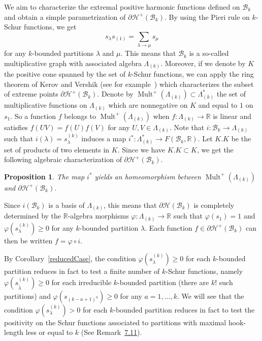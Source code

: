 \documentclass[10pt,a4paper]{amsart}
\newtheorem{prop}[theorem]{Proposition}
\theoremstyle{definition}
\DeclareMathOperator{\Mult}{Mult}
\begin{document}
We aim to characterize the extremal positive harmonic functions
defined on $\mathcal{B}_{k}$ and obtain a simple parametrization of
$\partial\mathcal{H}^{+}(\mathcal{B}_{k})$. By using the Pieri rule on
$k$-Schur functions, we get%
\[
s_{\lambda}s_{(1)}=\sum_{\lambda\rightarrow\mu}s_{\mu}%
\]
for any $k$-bounded partitions $\lambda$ and $\mu$. This means that
$\mathcal{B}_{k}$ is a so-called multiplicative graph with associated algebra
$\Lambda_{(k)}$. Moreover, if we denote by $K$ the positive cone spanned by
the set of $k$-Schur functions, we can apply the ring theorem of Kerov and
Vershik (see for example~\cite[Section~8.4]{LT}) which characterizes the
subset of extreme points $\partial\mathcal{H}^{+}(\mathcal{B}_{k})$. Denote
by $\Mult ^{+}(\Lambda_{(k)})\subset\Lambda_{(k)}^{\ast}$ the set of
multiplicative functions on $\Lambda_{(k)}$ which are nonnegative on $K$ and
equal to $1$ on $s_{1}$. So a function $f$ belongs to $\Mult %
^{+}(\Lambda_{(k)})$ when $f:\Lambda_{(k)}\rightarrow\mathbb{R}$ is linear and
satisfies $f(UV)=f(U)f(V)$ for any $U,V\in\Lambda_{(k)}$. Note that
$i:\mathcal{B}_{k}\longrightarrow\Lambda_{(k)}$ such that $i(\lambda
)=s_{\lambda}^{(k)}$ induces a map $i^{\ast}:\Lambda_{(k)}^{\ast
}\longrightarrow F(\mathcal{B}_{k},\mathbb{R})$. Let $K.K$ be the set of products of two elements in $K$. Since we have $K.K\subset K$,
we get the following algebraic characterization of $\partial\mathcal{H}%
^{+}(\mathcal{B}_{k})$.

\begin{prop}
\label{multiGraphExtreme}The map $i^{\ast}$ yields an homeomorphism between
$\Mult ^{+}(\Lambda_{(k)})$ and $\partial\mathcal{H}^{+}(\mathcal{B}%
_{k})$. 
\end{prop}

Since $i(\mathcal{B}_{k})$ is a basis of $\Lambda_{(k)}$, this means that
$\partial\mathcal{H}(\mathcal{B}_{k})$ is completely determined by the
$\mathbb{R}$-algebra morphisms $\varphi:\Lambda_{(k)}\rightarrow\mathbb{R}$
such that $\varphi(s_{1})=1$ and $\varphi(s_{\lambda}^{(k)})\geq0$ for any
$k$-bounded partition $\lambda$. Each function $f\in\partial\mathcal{H}%
^{+}(\mathcal{B}_{k})$ can then be written $f=\varphi\circ i$.

By Corollary~\ref{reducedCase}, the condition $\varphi(s_{\lambda}^{(k)}%
)\geq0$ for each $k$-bounded partition reduces in fact to test a finite number
of $k$-Schur functions, namely $\varphi(s_{\widetilde{\lambda}}^{(k)})\geq0$
for each irreducible $k$-bounded partition (there are $k!$ such
partitions) and $\varphi(s_{(k-a+1)^{a}})\geq0$ for any $a=1,\ldots,k$. We
will see that the condition $\varphi(s_{\lambda}^{(k)})>0$ for each
$k$-bounded partition reduces in fact to test the positivity on the Schur
functions associated to partitions with maximal hook-length less or equal to
$k$ (See Remark~\href{https://alco.centre-mersenne.org/articles/10.5802/alco.147/}{7.11}).
\end{document}
